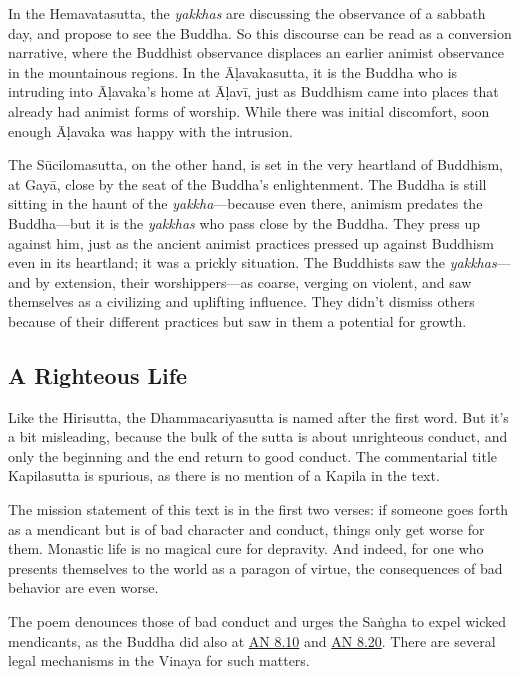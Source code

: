\documentclass[12pt,openany]{book}%
\begin{document}
In the Hemavatasutta, the \textit{yakkhas} are discussing the observance of a sabbath day, and propose to see the Buddha. So this discourse can be read as a conversion narrative, where the Buddhist observance displaces an earlier animist observance in the mountainous regions. In the \textsanskrit{Āḷavakasutta}, it is the Buddha who is intruding into \textsanskrit{Āḷavaka}’s home at \textsanskrit{Āḷavī}, just as Buddhism came into places that already had animist forms of worship. While there was initial discomfort, soon enough \textsanskrit{Āḷavaka} was happy with the intrusion.

The \textsanskrit{Sūcilomasutta}, on the other hand, is set in the very heartland of Buddhism, at \textsanskrit{Gayā}, close by the seat of the Buddha’s enlightenment. The Buddha is still sitting in the haunt of the \textit{yakkha}—because even there, animism predates the Buddha—but it is the \textit{yakkhas} who pass close by the Buddha. They press up against him, just as the ancient animist practices pressed up against Buddhism even in its heartland; it was a prickly situation. The Buddhists saw the \textit{yakkhas}—and by extension, their worshippers—as coarse, verging on violent, and saw themselves as a civilizing and uplifting influence. They didn’t dismiss others because of their different practices but saw in them a potential for growth.

\subsection*{A Righteous Life}

Like the Hirisutta, the Dhammacariyasutta is named after the first word. But it’s a bit misleading, because the bulk of the sutta is about unrighteous conduct, and only the beginning and the end return to good conduct. The commentarial title Kapilasutta is spurious, as there is no mention of a Kapila in the text.

The mission statement of this text is in the first two verses: if someone goes forth as a mendicant but is of bad character and conduct, things only get worse for them. Monastic life is no magical cure for depravity. And indeed, for one who presents themselves to the world as a paragon of virtue, the consequences of bad behavior are even worse.

The poem denounces those of bad conduct and urges the \textsanskrit{Saṅgha} to expel wicked mendicants, as the Buddha did also at \href{https://suttacentral.net/an8.10/en/sujato}{AN 8.10} and \href{https://suttacentral.net/an8.20/en/sujato}{AN 8.20}. There are several legal mechanisms in the Vinaya for such matters.
\end{document}
